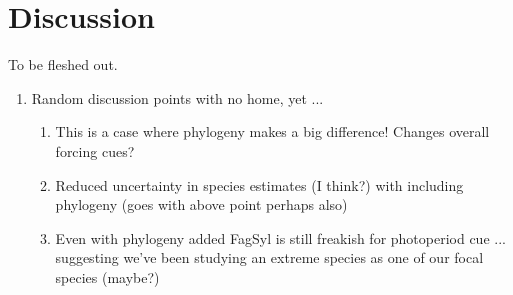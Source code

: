 \documentclass{article}\usepackage[]{graphicx}\usepackage[]{color}
\begin{document}
\section*{Discussion}
To be fleshed out.

\begin{enumerate}
\item Random discussion points with no home, yet ... 
\begin{enumerate}
\item This is a case where phylogeny makes a big difference! Changes overall forcing cues? 
\item Reduced uncertainty in species estimates (I think?) with including phylogeny (goes with above point perhaps also)
\item Even with phylogeny added FagSyl is still freakish for photoperiod cue ... suggesting we've been studying an extreme species as one of our focal species (maybe?)
\end{enumerate}
\end{enumerate}

\end{document}
